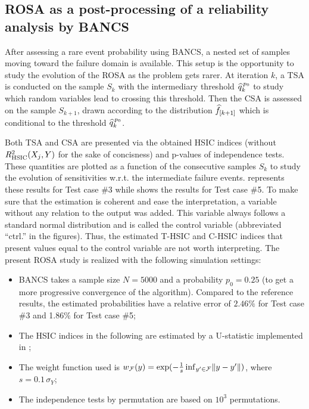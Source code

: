 \subsection{ROSA as a post-processing of a reliability analysis by BANCS}

After assessing a rare event probability using BANCS, a nested set of samples moving toward the failure domain is available.
This setup is the opportunity to study the evolution of the ROSA as the problem gets rarer.
At iteration $k$, a TSA is conducted on the sample $S_k$ with the intermediary threshold $\widehat{q}^{\, p_0}_k$ to study which random variables lead to crossing this threshold. 
Then the CSA is assessed on the sample $S_{k+1}$, drawn according to the distribution $\widehat{f}_{[k+1]}$ which is conditional to the threshold $\widehat{q}^{\, p_0}_k$. 

Both TSA and CSA are presented via the obtained HSIC indices (without $R^2_{\mathrm{HSIC}}(X_j, Y)$ for the sake of concisness) and p-values of independence tests. 
These quantities are plotted as a function of the consecutive samples $S_k$ to study the evolution of sensitivities w.r.t. the intermediate failure events. 
 represents these results for Test case \#3 while  shows the results for Test case \#5. 
To make sure that the estimation is coherent and ease the interpretation, a variable without any relation to the output was added. 
This variable always follows a standard normal distribution and is called the control variable (abbreviated ``ctrl.'' in the figures). 
Thus, the estimated T-HSIC and C-HSIC indices that present values equal to the control variable are not worth interpreting. 
The present ROSA study is realized with the following simulation settings:
\begin{itemize}
    \item BANCS takes a sample size $N=5000$ and a probability $p_0=0.25$ (to get a more progressive convergence of the algorithm). Compared to the reference results, the estimated probabilities have a relative error of $2.46\%$ for Test case \#3 and 1.86$\%$ for Test case \#5; 
    \item The HSIC indices in the following are estimated by a U-statistic implemented in \ot; 
    \item The weight function used is $w_{\mathcal{F}}(y) = \exp(-\frac1s \, \mathrm{inf}_{y'\in \mathcal{F}} \Vert y -y' \Vert)$, where $s=0.1 \, \sigma_Y$;
    \item The independence tests by permutation are based on $10^3$ permutations.
\end{itemize}


